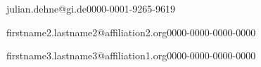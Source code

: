 \author[1]{Julian Dehne}{julian.dehne@gi.de}{0000-0001-9265-9619}
\author[2]{Firstname2 Lastname2}{firstname2.lastname2@affiliation2.org}{0000-0000-0000-0000}
\author[3]{Firstname3 Lastname3}{firstname3.lastname3@affiliation1.org}{0000-0000-0000-0000}

